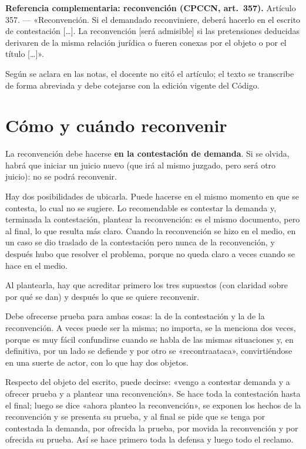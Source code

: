 \documentclass[12pt,oneside]{book}
\begin{document}
\begin{note}
\textbf{Referencia complementaria: reconvención (CPCCN, art.~357).}
Artículo 357. --- «Reconvención. Si el demandado reconviniere, deberá hacerlo en el escrito de contestación [\ldots]. La reconvención [será admisible] si las pretensiones deducidas derivaren de la misma relación jurídica o fueren conexas por el objeto o por el título [\ldots]».

Según se aclara en las notas, el docente no citó el artículo; el texto se transcribe de forma abreviada y debe cotejarse con la edición vigente del Código.
\end{note}

\section{Cómo y cuándo reconvenir}

La reconvención debe hacerse \textbf{en la contestación de demanda}. Si se olvida, habrá que iniciar un juicio nuevo (que irá al mismo juzgado, pero será otro juicio): no se podrá reconvenir.

Hay dos posibilidades de ubicarla. Puede hacerse en el mismo momento en que se contesta, lo cual no se sugiere. Lo recomendable es contestar la demanda y, terminada la contestación, plantear la reconvención: es el mismo documento, pero al final, lo que resulta más claro. Cuando la reconvención se hizo en el medio, en un caso se dio traslado de la contestación pero nunca de la reconvención, y después hubo que resolver el problema, porque no queda claro a veces cuando se hace en el medio.

Al plantearla, hay que acreditar primero los tres supuestos (con claridad sobre por qué se dan) y después lo que se quiere reconvenir.

Debe ofrecerse prueba para ambas cosas: la de la contestación y la de la reconvención. A veces puede ser la misma; no importa, se la menciona dos veces, porque es muy fácil confundirse cuando se habla de las mismas situaciones y, en definitiva, por un lado se defiende y por otro se «recontraataca», convirtiéndose en una suerte de actor, con lo que hay dos objetos.

Respecto del objeto del escrito, puede decirse: «vengo a contestar demanda y a ofrecer prueba y a plantear una reconvención». Se hace toda la contestación hasta el final; luego se dice «ahora planteo la reconvención», se exponen los hechos de la reconvención y se presenta su prueba, y al final se pide que se tenga por contestada la demanda, por ofrecida la prueba, por movida la reconvención y por ofrecida su prueba. Así se hace primero toda la defensa y luego todo el reclamo.
\end{document}
